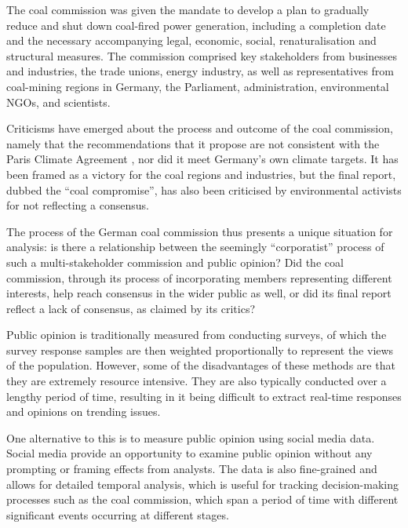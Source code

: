 \documentclass[10pt,twocolumn,twoside]{layout}
\begin{document}
The coal commission was given the mandate to develop a plan to gradually reduce and shut down coal-fired power generation, including a completion date and the necessary accompanying legal, economic, social, renaturalisation and structural measures. \cite{Groll2019} The commission comprised key stakeholders from businesses and industries, the trade unions, energy industry, as well as representatives from coal-mining regions in Germany, the Parliament, administration, environmental NGOs, and scientists. \cite{AgoraEnergiewende2019}

Criticisms have emerged about the process and outcome of the coal commission, namely that the recommendations that it propose are not consistent with the Paris Climate Agreement \cite{klimareporter2019a}, nor did it meet Germany's own climate targets. 
It has been framed as a victory for the coal regions and industries, but the final report, dubbed the ``coal compromise'', has also been criticised by environmental activists for not reflecting a consensus. \cite{klimareporter2019,endegelaende2019}  

The process of the German coal commission thus presents a unique situation for analysis: is there a relationship between the seemingly ``corporatist'' process of such a multi-stakeholder commission and public opinion? Did the coal commission, through its process of incorporating members representing different interests, help reach consensus in the wider public as well, or did its final report reflect a lack of consensus, as claimed by its critics?

Public opinion is traditionally measured from conducting surveys, of which the survey response samples are then weighted proportionally to represent the views of the population. However, some of the disadvantages of these methods are that they are extremely resource intensive. They are also typically conducted over a lengthy period of time, resulting in it being difficult to extract real-time responses and opinions on trending issues. 

One alternative to this is to measure public opinion using social media data. Social media provide an opportunity to examine public opinion without any prompting or framing effects from analysts. The data is also fine-grained and allows for detailed temporal analysis, which is useful for tracking decision-making processes such as the coal commission, which span a period of time with different significant events occurring at different stages. 
\end{document}
